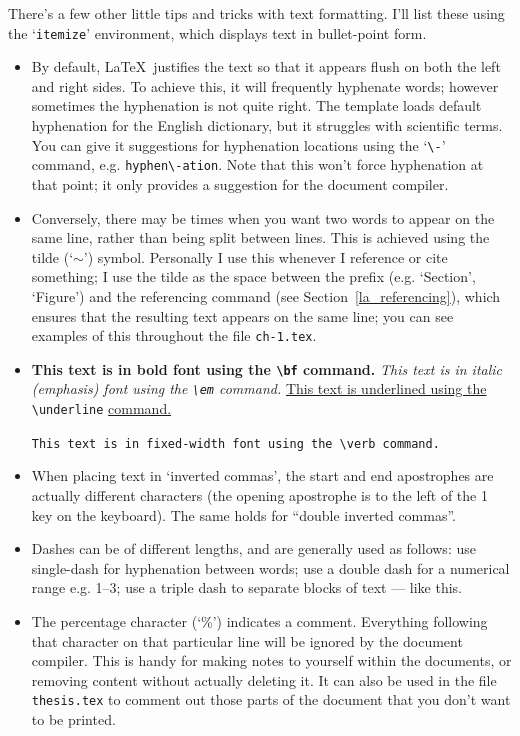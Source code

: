 There's a few other little tips and tricks with text formatting. I'll list these using the `\verb+itemize+' environment, which displays text in bullet-point form.

\begin{itemize}

\item By default, \LaTeX~justifies the text so that it appears flush on both the left and right sides. To achieve this, it will frequently hyphenate words; however sometimes the hyphenation is not quite right. The template loads default hyphenation for the English dictionary, but it struggles with scientific terms. You can give it suggestions for hyphenation locations using the `\verb+\-+' command, e.g. \verb+hyphen\-ation+. Note that this won't force hyphenation at that point; it only provides a suggestion for the document compiler.

\item Conversely, there may be times when you want two words to appear on the same line, rather than being split between lines. This is achieved using the tilde (`$\sim$') symbol. Personally I use this whenever I reference or cite something; I use the tilde as the space between the prefix (e.g. `Section', `Figure') and the referencing command (see Section~\ref{la_referencing}), which ensures that the resulting text appears on the same line; you can see examples of this throughout the file \verb+ch-1.tex+.

\item {\bf This text is in bold font using the \verb+\bf+ command.} {\em This text is in italic (emphasis) font using the \verb+\em+ command.} \underline{This text is underlined using the} \verb+\underline+ \underline{command.}

\verb+This text is in fixed-width font using the \verb command.+

\item When placing text in `inverted commas', the start and end apostrophes are actually different characters (the opening apostrophe is to the left of the 1 key on the keyboard). The same holds for ``double inverted commas''.

\item Dashes can be of different lengths, and are generally used as follows: use single-dash for hyphenation between words; use a double dash for a numerical range e.g. 1--3; use a triple dash to separate blocks of text --- like this.

\item The percentage character (`\%') indicates a comment. Everything following that character on that particular line will be ignored by the document compiler. This is handy for making notes to yourself within the documents, or removing content without actually deleting it. It can also be used in the file \verb+thesis.tex+ to comment out those parts of the document that you don't want to be printed.

\end{itemize}

